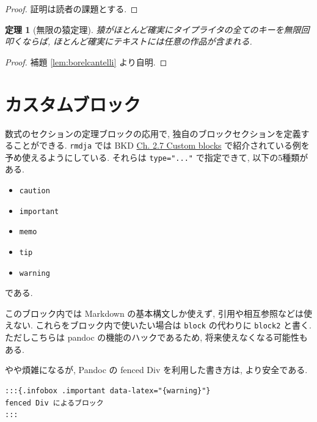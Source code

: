\documentclass[
  xelatex,ja=standard,jafont=noto]{bxjsbook}
\providecommand{\tightlist}{%
  \setlength{\itemsep}{0pt}\setlength{\parskip}{0pt}}
\newtheorem{theorem}{定理}[chapter]
\theoremstyle{definition}
\theoremstyle{definition}
\theoremstyle{definition}
\theoremstyle{definition}
\theoremstyle{remark}
\begin{document}
\begin{proof}
{}証明は読者の課題とする. \end{proof}

\begin{theorem}[無限の猿定理]
\protect\hypertarget{thm:theorem1}{}{\label{thm:theorem1}
{}
}猿がほとんど確実にタイプライタの全てのキーを無限回叩くならば,
ほとんど確実にテキストには任意の作品が含まれる. \end{theorem}

\begin{proof}
{}補題 \ref{lem:borelcantelli} より自明.
\end{proof}

\hypertarget{ux30abux30b9ux30bfux30e0ux30d6ux30edux30c3ux30af}{%
\section{カスタムブロック}\label{ux30abux30b9ux30bfux30e0ux30d6ux30edux30c3ux30af}}

数式のセクションの定理ブロックの応用で,
独自のブロックセクションを定義することができる. \texttt{rmdja} では BKD
\href{https://bookdown.org/yihui/bookdown/custom-blocks.html}{Ch. 2.7
Custom blocks} で紹介されている例を予め使えるようにしている. それらは
\texttt{type="..."} で指定できて, 以下の5種類がある.

\begin{itemize}
\tightlist
\item
  \texttt{caution}
\item
  \texttt{important}
\item
  \texttt{memo}
\item
  \texttt{tip}
\item
  \texttt{warning}
\end{itemize}

である.

このブロック内では Markdown の基本構文しか使えず,
引用や相互参照などは使えない. これらをブロック内で使いたい場合は
\texttt{block} の代わりに \texttt{block2} と書く. ただしこちらは pandoc
の機能のハックであるため, 将来使えなくなる可能性もある.

やや煩雑になるが, Pandoc の fenced Div を利用した書き方は,
より安全である.

\begin{verbatim}
:::{.infobox .important data-latex="{warning}"}
fenced Div によるブロック
:::
\end{verbatim}
\end{document}
